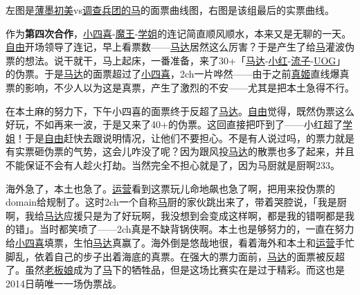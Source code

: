 
左图是\uline{薄墨初美}vs\uline{调查兵团的马}的面票曲线图，右图是该组最后的实票曲线。

作为\textbf{第四次合作}，\uline{小四喜}-\uline{魔王}-\uline{学姐}的连记简直顺风顺水，本来又是无聊的一天。\uline{自由}开场领导了连记，早上看票数——\uline{马达}居然这么厉害？于是产生了给\uline{马}灌波伪票的想法。说干就干，马上起床，一番准备，来了30+「\uline{马达}-\uline{小红}-\uline{流子}-\uline{UOG}」的伪票。于是\uline{马达}的面票超过了\uline{小四喜}，2ch一片哗然——由于之前\uline{真姬}直线爆真票的影响，不少人以为这是真票，产生了激烈的不安——尤其是把本土急得不行。

在本土麻的努力下，下午小四喜的面票终于反超了\uline{马达}。\uline{自由}觉得，既然伪票这么好玩，不如再来一波，于是又来了40+的伪票。这回直接把吓到了——小红超了\uline{学姐}！于是\uline{自由}赶快去跟说明情况，让他们不要担心。不是有人说过吗，的票力就是有实票砸伪票的气势，这会儿咋没了呢？因为跟风投\uline{马达}的散票也多了起来，并且不能保证不会有人趁火打劫。当然完全不担心就是了，因为马厨就是厨啊233。

海外急了，本土也急了。\uline{运营}看到这票玩儿命地飙也急了啊，把用来投伪票的domain给规制了。这时2ch一个自称\uline{马}厨的家伙跳出来了，带着哭腔说，「我是厨啊，我给\uline{马达}应援只是为了好玩啊，我没想到会变成这样啊，都是我的错啊都是我的错」。当时都笑喷了——2ch真是不缺背锅侠啊。本土也是够努力的，一直在努力给\uline{小四喜}填票，生怕\uline{马达}真赢了。海外倒是悠哉地很，看着海外和本土和\uline{运营}手忙脚乱，依着自己的步子出着海底的真票。在强大的票力面前，\uline{马达}的面票被反超了。虽然\uline{老板娘}成为了\uline{马}下的牺牲品，但是这场比赛实在是过于精彩。而这也是2014日萌唯一一场伪票战。

